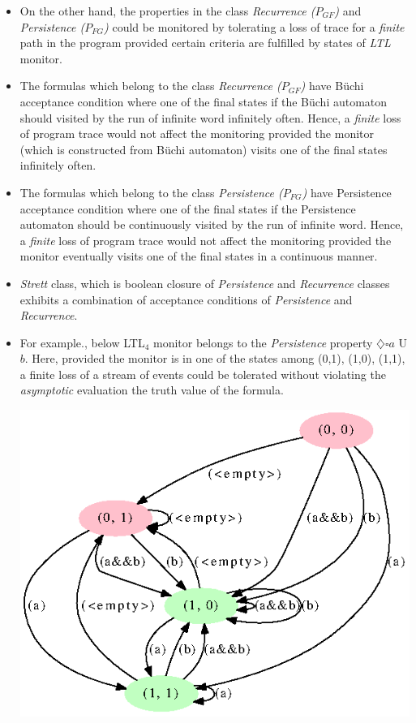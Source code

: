 \documentclass[]{article}
\begin{document}
\begin{itemize}
    \item On the other hand, the properties in the class \emph{Recurrence ($P_{GF}$)} and \emph{Persistence ($P_{FG}$)} could be monitored by tolerating a loss of trace for a \emph{finite} path in the program provided certain criteria are fulfilled by states of \emph{LTL} monitor.
    
    \item The formulas which belong to the class \emph{Recurrence ($P_{GF}$)} have B\"{u}chi acceptance condition where one of the final states if the B\"{u}chi automaton should visited by the run of infinite word infinitely often. Hence, a \emph{finite} loss of program trace would not affect the monitoring provided the monitor (which is constructed from B\"{u}chi automaton) visits one of the final states infinitely often.
    
    \item The formulas which belong to the class \emph{Persistence ($P_{FG}$)} have Persistence acceptance condition where one of the final states if the Persistence automaton should be continuously visited by the run of infinite word. Hence, a \emph{finite} loss of program trace would not affect the monitoring provided the monitor eventually visits one of the final states in a continuous manner.
    
    \item \emph{Strett} class, which is boolean closure of \emph{Persistence} and \emph{Recurrence} classes exhibits a combination of acceptance conditions of \emph{Persistence} and \emph{Recurrence}. 	
    
    \item For example., below LTL$_4$ monitor belongs to the \emph{Persistence} property $\diamondsuit \square a$ U $b$. Here, provided the monitor is in one of the states among (0,1), (1,0), (1,1), a finite loss of a stream of events could be tolerated without violating the \emph{asymptotic} evaluation the truth value of the formula. 
     
    \includegraphics[scale=0.6]{FGExample.png}
    

\end{itemize}
\end{document}
